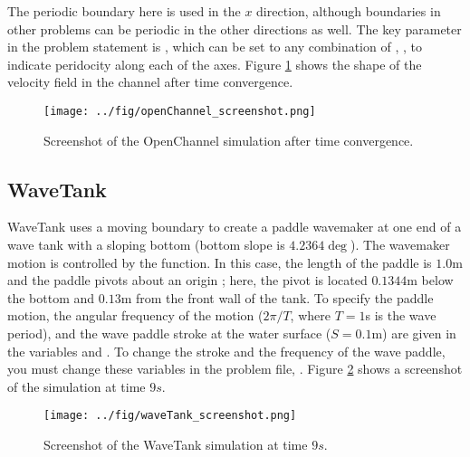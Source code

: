 \documentclass{../GPUSPHtemplate}
\begin{document}
The periodic boundary here is used in the $x$ direction, although
boundaries in other problems can be periodic in the other directions as
well. The key parameter in the problem statement is
, which can be set to any combination of
, ,  to indicate
peridocity along each of the axes.
Figure \ref{fig:OpenChannel} shows the shape of the velocity field in 
the channel after time convergence.
\begin{figure}[h]
  \begin{center}
    \texttt{[image: ../fig/openChannel\_screenshot.png]}
    \caption{Screenshot of the OpenChannel simulation after time convergence.}\label{fig:OpenChannel}
  \end{center}
\end{figure}

\subsection{WaveTank}

WaveTank uses a moving boundary to create a paddle wavemaker at one end
of a wave tank with a sloping bottom (bottom slope is $4.2364\deg$). The
wavemaker motion is controlled by the  function. In
this case, the length of the paddle is $1.0$m and the paddle pivots
about an origin ; here, the pivot is located $0.1344$m
below the bottom and $0.13$m from the front wall of the tank. To specify
the paddle motion, the angular frequency of the motion ($2 \pi/T$, where
$T=1$s is the wave period), and the wave paddle stroke at the water
surface ($S=0.1$m) are given in the variables  and
. To change the stroke and the frequency of the wave
paddle, you must change these variables in the problem file,
.
Figure \ref{fig:WaveTank} shows a screenshot of the simulation at time $9s$.

\iffalse
\begin{figure}[h]
\centering{%
\texttt{[image: paddle.png]}%
}
\caption{Schematic of the wave paddle for \cmd{WaveTank.cc}}
\end{figure}
\else
\fi

\begin{figure}[h]
  \begin{center}
    \texttt{[image: ../fig/waveTank\_screenshot.png]}
    \caption{Screenshot of the WaveTank simulation at time $9s$.}\label{fig:WaveTank}
  \end{center}
\end{figure}
\end{document}
